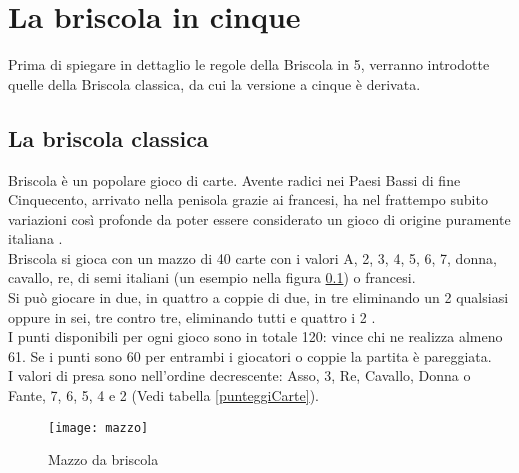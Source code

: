 
\chapter*{La briscola in cinque}


\ifpdf
    \graphicspath{{Chapter1/Chapter1Figs/PNG/}{Chapter1/Chapter1Figs/PDF/}{Chapter1/Chapter1Figs/}}
\else
    \graphicspath{{Chapter1/Chapter1Figs/EPS/}{Chapter1/Chapter1Figs/}}
\fi


Prima di spiegare in dettaglio le regole della Briscola in 5, verranno introdotte quelle della Briscola classica, da cui la versione a cinque è derivata.


\section{La briscola classica}


Briscola è un popolare gioco di carte. Avente radici nei Paesi Bassi di fine Cinquecento, arrivato nella penisola grazie ai francesi, ha nel frattempo subito variazioni così profonde da poter essere considerato un gioco di origine puramente italiana \cite{giochidicarte}.\\
Briscola si gioca con un mazzo di 40 carte con i valori A, 2, 3, 4, 5, 6, 7, donna, cavallo, re, di semi italiani (un esempio nella figura \ref{MazzoBriscola}) o francesi. \\
Si può giocare in due, in quattro a coppie di due, in tre eliminando un 2 qualsiasi oppure in sei, tre contro tre, eliminando tutti e quattro i 2 \cite{giochidicarte}.\\
I punti disponibili per ogni gioco sono in totale 120: vince chi ne realizza almeno 61. Se i punti sono 60 per entrambi i giocatori o coppie la partita è pareggiata.\\
I valori di presa sono nell'ordine decrescente: Asso, 3, Re, Cavallo, Donna o Fante, 7, 6, 5, 4 e 2 (Vedi tabella \ref{punteggiCarte}).


\begin{figure}[!htbp]
  \begin{center}
    \leavevmode
      \texttt{[image: mazzo]}
    \caption{Mazzo da briscola}
    \label{MazzoBriscola}
  \end{center}
\end{figure}


